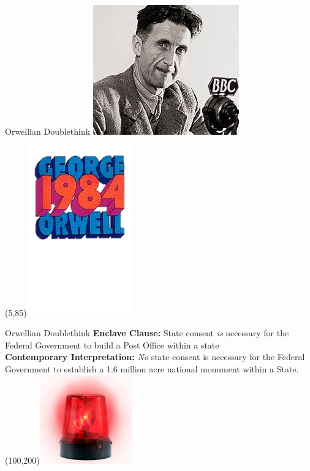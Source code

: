 \begin{frame}{Orwellian Doublethink}
    \centering
    \includegraphics[width=.85\textwidth]{img/orwell.png} \\
    \Put(5,85){\includegraphics[width=.3\textwidth]{img/1984.png}}
\end{frame}

\begin{frame}{Orwellian Doublethink}
    \vspace{1pt}
    { \Large
    \textbf{Enclave Clause:} State consent \emph{is} necessary for the Federal Government to build a Post Office within a state \\
    \vspace{20pt}
    \pause
    \textbf{Contemporary Interpretation:} \emph{No} state consent is necessary for the Federal Government to establish a 1.6 million acre national monument within a State. \\
    }
    \pause
    \Put(100,200){\includegraphics[with=.4\textwidth]{img/red-light.png}}
\end{frame}

